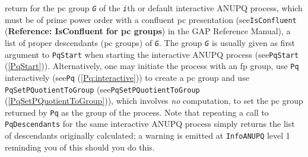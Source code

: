\documentclass[a4paper,11pt]{report}
\begin{document}
{{{ return for the pc group \mbox{\texttt{\mdseries\slshape G}} of the \mbox{\texttt{\mdseries\slshape i}}th or default interactive \textsf{ANUPQ} process, which must be of prime power order with a confluent pc presentation
(see{\nobreakspace}\texttt{IsConfluent} (\textbf{Reference: IsConfluent for pc groups}) in the \textsf{GAP} Reference Manual), a list of proper descendants (pc groups) of \mbox{\texttt{\mdseries\slshape G}}. The group \mbox{\texttt{\mdseries\slshape G}} is usually given as first argument to \texttt{PqStart} when starting the interactive \textsf{ANUPQ} process (see{\nobreakspace}\texttt{PqStart} (\ref{PqStart})). Alternatively, one may initiate the process with an fp group, use \texttt{Pq} interactively (see{\nobreakspace}\texttt{Pq} (\ref{Pq:interactive})) to create a pc group and use \texttt{PqSetPQuotientToGroup} (see{\nobreakspace}\texttt{PqSetPQuotientToGroup} (\ref{PqSetPQuotientToGroup})), which involves \emph{no} computation, to set the pc group returned by \texttt{Pq} as the group of the process. Note that repeating a call to \texttt{PqDescendants} for the same interactive \textsf{ANUPQ} process simply returns the list of descendants originally calculated; a
warning is emitted at \texttt{InfoANUPQ} level 1 reminding you of this should you do this. 

}}}
\end{document}
